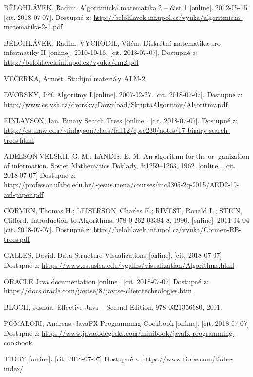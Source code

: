 \documentclass[
  biblatex=false,
  font=serif,
  glossaries=false,
  tables=false,
  theorems=false,
  index
]{kidiplom}
\begin{document}
\begin{thebibliography}{99}	

 \uppercase{BĚlohlávek}, Radim. Algoritmická matematika 2 -- část 1 [online]. 2012-05-15. [cit. 2018-07-07]. Dostupné z: \url{http://belohlavek.inf.upol.cz/vyuka/algoritmicka-matematika-2-1.pdf}

 \uppercase{BĚlohlávek}, Radim; \uppercase{Vychodil}, Vilém. Diskrétní matematika pro informatiky II [online]. 2010-10-16. [cit. 2018-07-07]. Dostupné z: \url{http://belohlavek.inf.upol.cz/vyuka/dm2.pdf}

 \uppercase{veČerka}, Arnošt. Studijní materiály ALM-2

 \uppercase{DvorskÝ}, Jiří. Algoritmy I.[online]. 2007-02-27. [cit. 2018-07-07]. Dostupné z: \url{http://www.cs.vsb.cz/dvorsky/Download/SkriptaAlgoritmy/Algoritmy.pdf}

 \uppercase{Finlayson}, Ian. Binary Search Trees [online]. [cit. 2018-07-07].
Dostupné z: \url{http://cs.umw.edu/~finlayson/class/fall12/cpsc230/notes/17-binary-search-trees.html}

 \uppercase{Adelson-Velskii}, G. M.; \uppercase{Landis}, E. M. An algorithm for the or-
ganization of information. Soviet Mathematics Doklady, 3:1259–1263, 1962. [online]. [cit. 2018-07-07] Dostupné z: \url{http://professor.ufabc.edu.br/~jesus.mena/courses/mc3305-2q-2015/AED2-10-avl-paper.pdf}

 \uppercase{Cormen}, Thomas H.; \uppercase{Leiserson}, Charles E.; \uppercase{Rivest}, Ronald L.; \uppercase{Stein}, Clifford. Introduction to Algorithms, 978-0-262-03384-8, 1990. [online]. 2011-04-04  [cit. 2018-07-07]. Dostupné z: \url{http://belohlavek.inf.upol.cz/vyuka/Cormen-RB-trees.pdf}

 \uppercase{Galles}, David. Data Structure Visualizations [online]. [cit. 2018-07-07]
Dostupné z: \url{https://www.cs.usfca.edu/~galles/visualization/Algorithms.html}

 ORACLE Java documentation [online]. [cit. 2018-07-07] Dostupné z: \url{https://docs.oracle.com/javase/8/javase-clienttechnologies.htm}

 \uppercase{Bloch}, Joshua. Effective Java -- Second Edition, 978-0321356680, 2001.

 \uppercase{Pomalori}, Andreas. JavaFX Programming Cookbook [online]. [cit. 2018-07-07] Dostupné z: \url{https://www.javacodegeeks.com/minibook/javafx-programming-cookbook}

 \uppercase{Tioby} [online]. [cit. 2018-07-07] Dostupné z: \url{https://www.tiobe.com/tiobe-index/}


\end{thebibliography}
\end{document}
